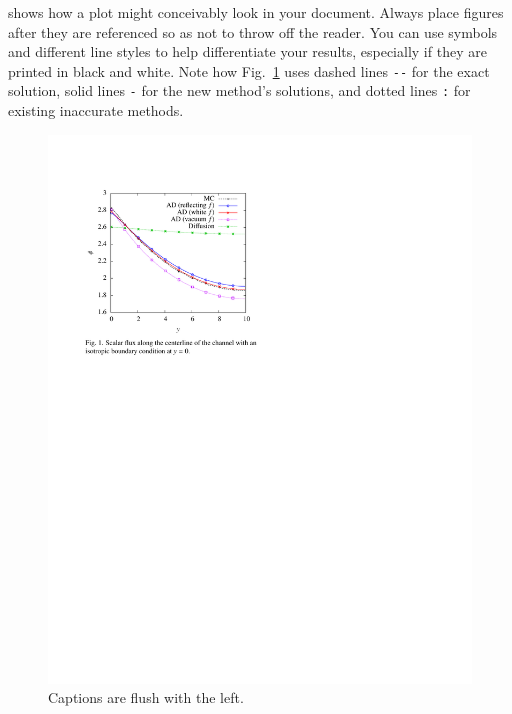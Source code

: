 \documentclass{anstrans}
\begin{document}
shows how a plot might conceivably look in your
document. Always place figures after they are referenced so as not to throw
off the reader. You can use symbols and different line styles to help
differentiate your results, especially if they are printed in black and white.
Note how Fig.~\ref{fig:voltage} uses dashed lines \verb|--| for the exact
solution, solid lines \verb|-| for the new method's solutions, and dotted lines
\verb|:| for existing inaccurate methods.
\begin{figure}[ht] %
  \centering
  \includegraphics{example_figure}
  \caption{Captions are flush with the left.}
  \label{fig:voltage}
\end{figure}
\end{document}

